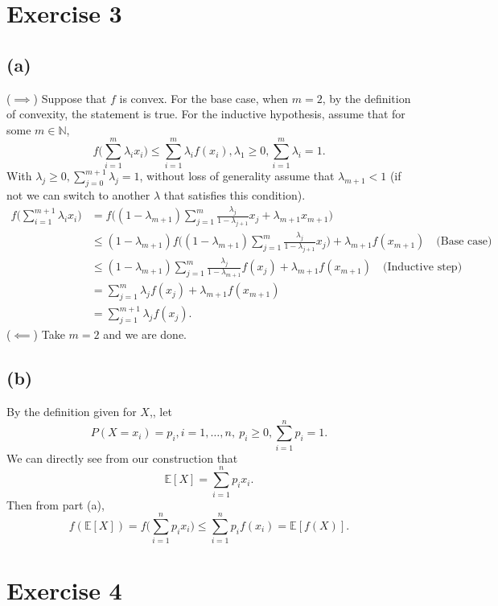 \documentclass{article}
\begin{document}
\newpage
\section*{Exercise 3}
\subsection*{(a)}
($\implies$) Suppose that $f$ is convex. For the base case, when $m = 2$, by the definition of convexity, the statement is true. 
For the inductive hypothesis, assume that for some $m \in \mathbb{N}$, 
\[ f \biggl( \sum_{i = 1}^{m} \lambda_i x_i \biggr) \leq \sum_{i = 1}^{m} \lambda_i f(x_i), \lambda_1 \geq 0, \sum_{i = 1}^{m} \lambda_i = 1. \]
With $\lambda_j \geq 0, \sum_{j = 0}^{m + 1} \lambda_j = 1$, without loss of generality assume that $\lambda_{m + 1} < 1$ (if not we can switch 
to another $\lambda$ that satisfies this condition). 
\begin{align*}
	f \biggl( \sum_{i = 1}^{m + 1} \lambda_i x_i \biggr) 
	&= f \biggl( (1 - \lambda_{m + 1}) \sum_{j = 1}^{m} \frac{\lambda_j}{1 - \lambda_{j + 1}} x_j + \lambda_{m + 1} x_{m + 1} \biggr) \\
	&\leq (1 - \lambda_{m + 1})  f \biggl( (1 - \lambda_{m + 1}) \sum_{j = 1}^{m} \frac{\lambda_j}{1 - \lambda_{j + 1}} x_j \biggr) 
	+ \lambda_{m + 1} f(x_{m + 1}) \quad \text{(Base case)} \\
	&\leq (1 - \lambda_{m + 1}) \sum_{j = 1}^{m} \frac{\lambda_j}{1 - \lambda_{m + 1}}f(x_j) + \lambda_{m + 1}f(x_{m + 1}) \quad 
	\text{(Inductive step)} \\
	&= \sum_{j = 1}^{m} \lambda_j f(x_j) + \lambda_{m + 1} f(x_{m + 1}) \\
	&= \sum_{j = 1}^{m + 1} \lambda_j f(x_j).
\end{align*}
($\impliedby$) Take $m = 2$ and we are done.

\subsection*{(b)}
By the definition given for $X$,, let 
\[ P(X = x_i) = p_i, i = 1, \dots, n, \ p_i \geq 0, \sum_{i = 1}^{n} p_i = 1. \]
We can directly see from our construction that 
\[ \mathbb{E}[X] = \sum_{i = 1}^{n} p_i x_i. \]
Then from part (a), 
\[ f(\mathbb{E}[X]) = f \biggl( \sum_{i = 1}^{n} p_i x_i \biggr) 
\leq \sum_{i = 1}^{n} p_i f(x_i) = \mathbb{E}[f(X)]. \]


\newpage
\section*{Exercise 4}
\end{document}
